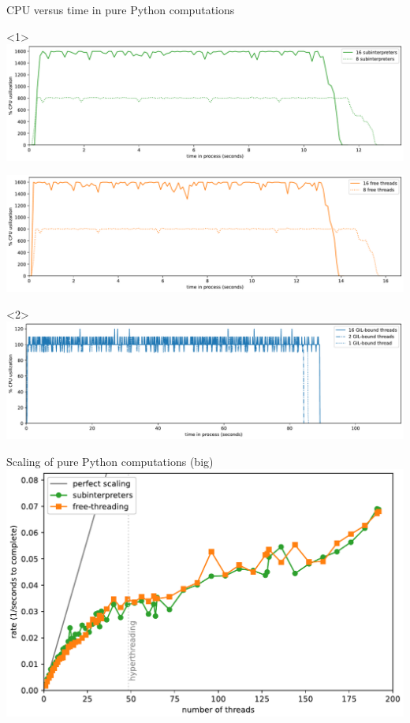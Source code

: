\documentclass[aspectratio=169]{beamer}
\begin{document}
\begin{frame}{CPU versus time in pure Python computations}
\vspace{0.25 cm}
\begin{center}
\begin{onlyenv}<1>
\includegraphics[width=0.93\linewidth]{img/cpu-of-compute-subinterpreters.pdf}

\includegraphics[width=0.93\linewidth]{img/cpu-of-compute-free-threads.pdf}
\end{onlyenv}\begin{onlyenv}<2>
\includegraphics[width=0.93\linewidth]{img/cpu-of-compute-gil-threads.pdf}
\end{onlyenv}
\end{center}
\end{frame}

\begin{frame}{Scaling of pure Python computations (big)}
\vspace{0.5 cm}
\includegraphics[width=0.8\linewidth]{img/scaling-of-compute-big.pdf}
\end{frame}
\end{document}
